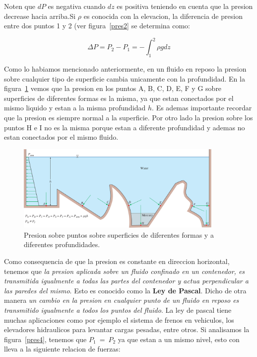 \documentclass[10pt, oneside]{article}
\begin{document}
Noten que $dP$ es negativa cuando $dz$ es positiva teniendo en cuenta que la presion decrease hacia arriba.Si $\rho$ es conocida con la elevacion, la diferencia de presion entre dos puntos 1 y 2 (ver figura~\ref{pres2} se determina como:

\begin{equation}
\Delta P = P_2 - P_1 = -\int_1^2 \rho g dz
\label{ppr5}
\end{equation}

Como lo habiamos mencionado anteriormente, en un fluido en reposo la presion sobre cualquier tipo de superficie cambia unicamente con la profundidad. En la figura~\ref{pres3} vemos que la presion en los puntos A, B, C, D, E, F y G sobre superficies de diferentes formas es la misma, ya que estan conectados por el mismo liquido y estan a la misma profundidad $h$. Es ademas importante recordar que la presion es siempre normal a la superficie. Por otro lado la presion sobre los puntos H e I no es la misma porque estan a diferente profundidad y ademas no estan conectados por el mismo fluido. 

\begin{figure}[h]
\centering
\includegraphics[width=10cm]{pres3}
\caption{Presion sobre puntos sobre superficies de diferentes formas y a diferentes profundidades.}
\label{pres3}
\end{figure}

Como consequencia de que la presion es constante en direccion horizontal, tenemos que \textit{la presion aplicada sobre un fluido confinado en un contenedor, es transmitida igualmente a todas las partes del contenedor y actua perpendicular a las paredes del mismo}. Esto es conocido como la \textbf{Ley de Pascal}. Dicho de otra manera \textit{un cambio en la presion en cualquier punto de un fluido en reposo es transmitido igualmente a todos los puntos del fluido}. La ley de pascal tiene muchas aplicaciones como por ejemplo el sistema de frenos en vehiculos, los elevadores hidraulicos para levantar cargas pesadas, entre otros. Si analisamos la figura~\ref{pres4}, tenemos que $P_1 \ =\ P_2$ ya que estan a un mismo nivel, esto con lleva a la siguiente relacion de fuerzas:
\end{document}

